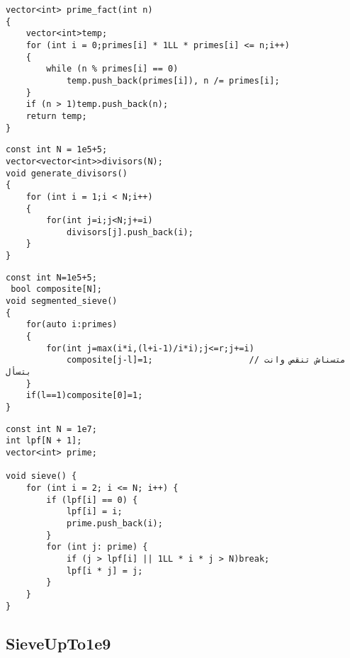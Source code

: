 \begin{lstlisting}[style=cpp]
vector<int> prime_fact(int n)
{
	vector<int>temp;
	for (int i = 0;primes[i] * 1LL * primes[i] <= n;i++)
	{
		while (n % primes[i] == 0)
			temp.push_back(primes[i]), n /= primes[i];
	}
	if (n > 1)temp.push_back(n);
	return temp;
}
\end{lstlisting}

\begin{lstlisting}[style=cpp]
const int N = 1e5+5;
vector<vector<int>>divisors(N);
void generate_divisors() 
{
	for (int i = 1;i < N;i++)
	{
		for(int j=i;j<N;j+=i)
			divisors[j].push_back(i);
	}
}
\end{lstlisting}

\begin{lstlisting}[style=cpp]
 const int N=1e5+5;
 bool composite[N];
void segmented_sieve()
{
	for(auto i:primes)
	{
		for(int j=max(i*i,(l+i-1)/i*i);j<=r;j+=i)
	     	composite[j-l]=1;                   // متسناش تنقص وانت بتسأل 
	}
	if(l==1)composite[0]=1;
}
\end{lstlisting}

\begin{lstlisting}[style=cpp]
const int N = 1e7;  
int lpf[N + 1];  
vector<int> prime;  
  
void sieve() {  
    for (int i = 2; i <= N; i++) {  
        if (lpf[i] == 0) {  
            lpf[i] = i;  
            prime.push_back(i);  
        }  
        for (int j: prime) {  
            if (j > lpf[i] || 1LL * i * j > N)break;  
            lpf[i * j] = j;  
        }  
    }  
}
\end{lstlisting}

\subsection{SieveUpTo1e9}

